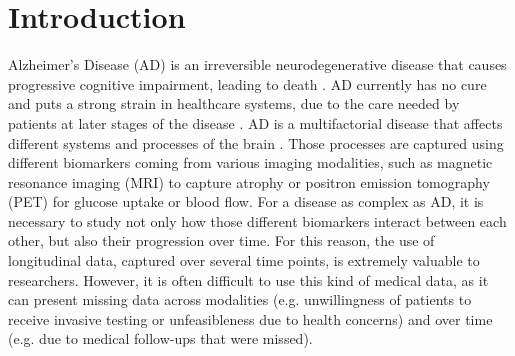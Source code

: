 \section{Introduction}

Alzheimer's Disease (AD) is an irreversible neurodegenerative disease that causes progressive cognitive impairment, leading to death \cite{Lane2018}. AD currently has no cure and puts a strong strain in healthcare systems, due to the care needed by patients at later stages of the disease \cite{AlzheimersAssociation}. AD is a multifactorial disease that affects different systems and processes of the brain \cite{Jack2010}. Those processes are captured using different biomarkers coming from various imaging modalities, such as magnetic resonance imaging (MRI) to capture atrophy or positron emission tomography (PET) for glucose uptake or blood flow. For a disease as complex as AD, it is necessary to study not only how those different biomarkers interact between each other, but also their progression over time. For this reason, the use of longitudinal data, captured over several time points, is extremely valuable to researchers. However, it is often difficult to use this kind of medical data, as it can present missing data across modalities (e.g. unwillingness of  patients to receive invasive testing or unfeasibleness due to health concerns) and over time (e.g. due to medical follow-ups that were missed). \\

